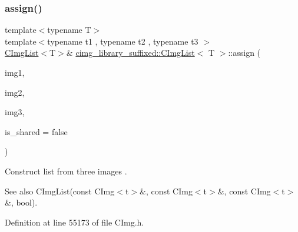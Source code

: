 \mbox{\label{structcimg__library__suffixed_1_1CImgList_ac6f8bbbcd34f7987744bffcf53f91777}} 
\subsubsection{\texorpdfstring{assign()}{assign()}\hspace{0.1cm}{\footnotesize\ttfamily [10/18]}}
{\footnotesize\ttfamily template$<$typename T$>$ \\
template$<$typename t1 , typename t2 , typename t3 $>$ \\
\hyperlink{structcimg__library__suffixed_1_1CImgList}{C\+Img\+List}$<$T$>$\& \hyperlink{structcimg__library__suffixed_1_1CImgList}{cimg\+\_\+library\+\_\+suffixed\+::\+C\+Img\+List}$<$ T $>$\+::assign (\begin{DoxyParamCaption}\item[{const \hyperlink{structcimg__library__suffixed_1_1CImg}{C\+Img}$<$ t1 $>$ \&}]{img1,  }\item[{const \hyperlink{structcimg__library__suffixed_1_1CImg}{C\+Img}$<$ t2 $>$ \&}]{img2,  }\item[{const \hyperlink{structcimg__library__suffixed_1_1CImg}{C\+Img}$<$ t3 $>$ \&}]{img3,  }\item[{const bool}]{is\+\_\+shared = {\ttfamily false} }\end{DoxyParamCaption})\hspace{0.3cm}{\ttfamily [inline]}}



Construct list from three images . 

\begin{DoxySeeAlso}{See also}
C\+Img\+List(const C\+Img$<$t$>$\&, const C\+Img$<$t$>$\&, const C\+Img$<$t$>$\&, bool). 
\end{DoxySeeAlso}


Definition at line 55173 of file C\+Img.\+h.

\mbox{\label{structcimg__library__suffixed_1_1CImgList_a1670923003551b68bb933c6420716cb3}} 
